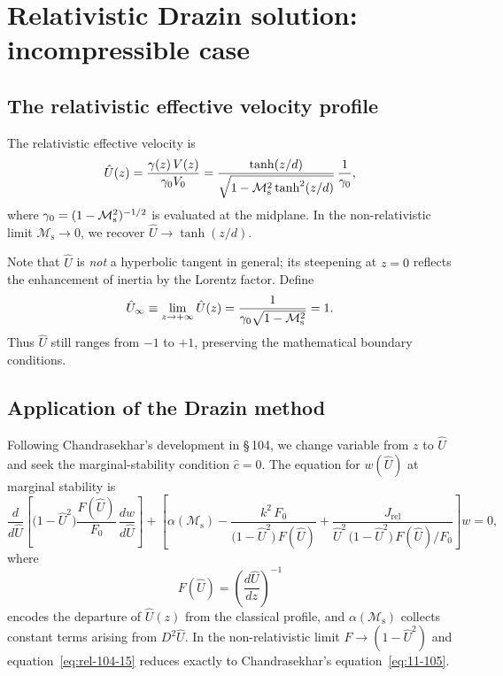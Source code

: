 \section{Relativistic Drazin solution: incompressible case}
\label{sec:rel-11-104-drazin}

\subsection{The relativistic effective velocity profile}
\label{sec:rel-11-104-drazin-prof}

The relativistic effective velocity is
\begin{equation}
\label{eq:rel-104-13}
\hat{U}(z) = \frac{\gamma(z)\,V(z)}{\gamma_0 V_0}
  = \frac{\tanh(z/d)}
         {\sqrt{1-\mathcal{M}_{\mathrm{s}}^2\tanh^2(z/d)}}\,
    \frac{1}{\gamma_0},
\end{equation}
where $\gamma_0 = (1-\mathcal{M}_{\mathrm{s}}^2)^{-1/2}$ is evaluated at the
midplane.  In the non-relativistic limit
$\mathcal{M}_{\mathrm{s}}\to 0$, we recover $\hat{U}\to\tanh(z/d)$.

Note that $\hat{U}$ is \emph{not} a hyperbolic tangent in general;
its steepening at $z=0$ reflects the enhancement of inertia by the
Lorentz factor.  Define
\begin{equation}
\label{eq:rel-104-14}
\hat{U}_\infty \equiv \lim_{z\to+\infty}\hat{U}(z)
  = \frac{1}{\gamma_0\sqrt{1-\mathcal{M}_{\mathrm{s}}^2}}
  = 1.
\end{equation}
Thus $\hat{U}$ still ranges from $-1$ to $+1$, preserving the
mathematical boundary conditions.

\subsection{Application of the Drazin method}
\label{sec:rel-11-104-drazin-method}

Following Chandrasekhar's development in \S\,104, we change variable
from $z$ to $\hat{U}$ and seek the marginal-stability condition
$\hat{c}=0$.  The equation for $w(\hat{U})$ at marginal stability is
\begin{equation}
\label{eq:rel-104-15}
\frac{d}{d\hat{U}}\!\left[\bigl(1-\hat{U}^2\bigr)
  \frac{F(\hat{U})}{F_0}\,\frac{dw}{d\hat{U}}\right]
+ \left[\alpha(\mathcal{M}_{\mathrm{s}})
  - \frac{k^2\,F_0}
         {\bigl(1-\hat{U}^2\bigr)\,F(\hat{U})}
  + \frac{J_{\mathrm{rel}}}{\hat{U}^2\,
    \bigl(1-\hat{U}^2\bigr)\,F(\hat{U})/F_0}\right]w = 0,
\end{equation}
where
\begin{equation}
\label{eq:rel-104-16}
F(\hat{U}) = \left(\frac{d\hat{U}}{dz}\right)^{-1}
\end{equation}
encodes the departure of $\hat{U}(z)$ from the classical profile, and
$\alpha(\mathcal{M}_{\mathrm{s}})$ collects constant terms arising from
$D^2\hat{U}$.  In the non-relativistic limit $F\to (1-\hat{U}^2)$
and equation~\eqref{eq:rel-104-15} reduces exactly to
Chandrasekhar's equation~\eqref{eq:11-105}.

